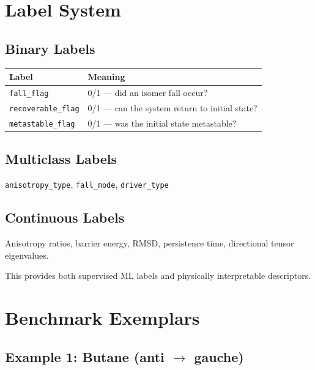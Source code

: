 \documentclass[11pt]{article}
\begin{document}
\section{Label System}

\subsection{Binary Labels}

\begin{center}
\begin{tabular}{lp{8cm}}
\toprule
\textbf{Label} & \textbf{Meaning} \\
\midrule
\texttt{fall\_flag} & 0/1 --- did an isomer fall occur? \\
\texttt{recoverable\_flag} & 0/1 --- can the system return to initial state? \\
\texttt{metastable\_flag} & 0/1 --- was the initial state metastable? \\
\bottomrule
\end{tabular}
\end{center}

\subsection{Multiclass Labels}

\texttt{anisotropy\_type}, \texttt{fall\_mode}, \texttt{driver\_type}

\subsection{Continuous Labels}

Anisotropy ratios, barrier energy, RMSD, persistence time, directional tensor eigenvalues.

This provides both supervised ML labels and physically interpretable descriptors.

\section{Benchmark Exemplars}

\subsection{Example 1: Butane (anti $\to$ gauche)}
\end{document}
